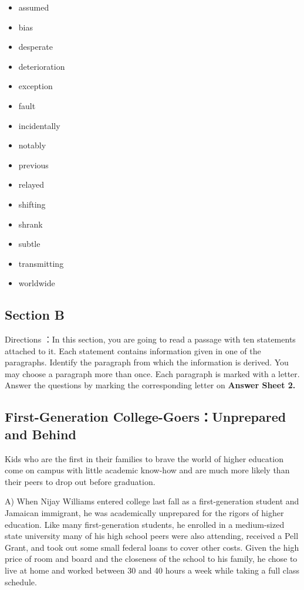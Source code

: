 \documentclass[UTF8,11pt]{ctexart}
\begin{document}
\begin{itemize}[leftmargin=2em,itemsep=.2em,topsep=.4em]\item[A.] assumed
\item[B.] bias
\item[C.] desperate
\item[D.] deterioration
\item[E.] exception
\item[F.] fault
\item[G.] incidentally
\item[H.] notably
\item[I.] previous
\item[J.] relayed
\item[K.] shifting
\item[L.] shrank
\item[M.] subtle
\item[N.] transmitting
\item[O.] worldwide
\end{itemize}

\subsection*{\textbf{Section B}}


Directions ：In this section, you are going to read a passage with ten statements attached to it. Each statement contains information given in one of the paragraphs. Identify the paragraph from which the information is derived. You may choose a paragraph more than once. Each paragraph is marked with a letter. Answer the questions by marking the corresponding letter on \textbf{Answer Sheet 2.}


\subsection*{\textbf{First-Generation College-Goers}：\textbf{Unprepared and Behind}}


Kids who are the first in their families to brave the world of higher education come on campus with little academic know-how and are much more likely than their peers to drop out before graduation.


A) When Nijay Williams entered college last fall as a first-generation student and Jamaican immigrant, he was academically unprepared for the rigors of higher education. Like many first-generation students, he enrolled in a medium-sized state university many of his high school peers were also attending, received a Pell Grant, and took out some small federal loans to cover other costs. Given the high price of room and board and the closeness of the school to his family, he chose to live at home and worked between 30 and 40 hours a week while taking a full class schedule.
\end{document}

